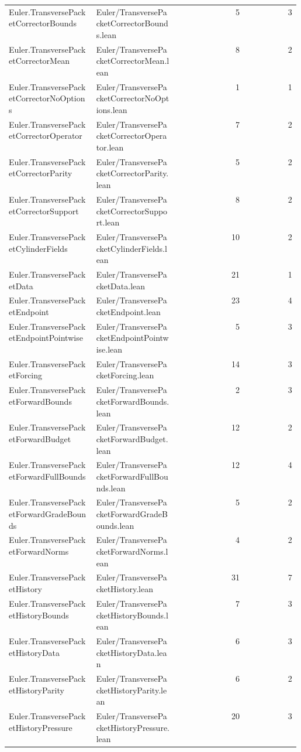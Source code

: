 \begin{longtable}{p{0.30\linewidth}p{0.28\linewidth}rr}
Euler.TransversePacketCorrectorBounds & Euler/TransversePacketCorrectorBounds.lean & 5 & 3\\
Euler.TransversePacketCorrectorMean & Euler/TransversePacketCorrectorMean.lean & 8 & 2\\
Euler.TransversePacketCorrectorNoOptions & Euler/TransversePacketCorrectorNoOptions.lean & 1 & 1\\
Euler.TransversePacketCorrectorOperator & Euler/TransversePacketCorrectorOperator.lean & 7 & 2\\
Euler.TransversePacketCorrectorParity & Euler/TransversePacketCorrectorParity.lean & 5 & 2\\
Euler.TransversePacketCorrectorSupport & Euler/TransversePacketCorrectorSupport.lean & 8 & 2\\
Euler.TransversePacketCylinderFields & Euler/TransversePacketCylinderFields.lean & 10 & 2\\
Euler.TransversePacketData & Euler/TransversePacketData.lean & 21 & 1\\
Euler.TransversePacketEndpoint & Euler/TransversePacketEndpoint.lean & 23 & 4\\
Euler.TransversePacketEndpointPointwise & Euler/TransversePacketEndpointPointwise.lean & 5 & 3\\
Euler.TransversePacketForcing & Euler/TransversePacketForcing.lean & 14 & 3\\
Euler.TransversePacketForwardBounds & Euler/TransversePacketForwardBounds.lean & 2 & 3\\
Euler.TransversePacketForwardBudget & Euler/TransversePacketForwardBudget.lean & 12 & 2\\
Euler.TransversePacketForwardFullBounds & Euler/TransversePacketForwardFullBounds.lean & 12 & 4\\
Euler.TransversePacketForwardGradeBounds & Euler/TransversePacketForwardGradeBounds.lean & 5 & 2\\
Euler.TransversePacketForwardNorms & Euler/TransversePacketForwardNorms.lean & 4 & 2\\
Euler.TransversePacketHistory & Euler/TransversePacketHistory.lean & 31 & 7\\
Euler.TransversePacketHistoryBounds & Euler/TransversePacketHistoryBounds.lean & 7 & 3\\
Euler.TransversePacketHistoryData & Euler/TransversePacketHistoryData.lean & 6 & 3\\
Euler.TransversePacketHistoryParity & Euler/TransversePacketHistoryParity.lean & 6 & 2\\
Euler.TransversePacketHistoryPressure & Euler/TransversePacketHistoryPressure.lean & 20 & 3\\

\end{longtable}
